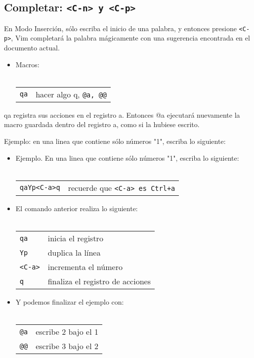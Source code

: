 \documentclass[12pt]{article}
\begin{document}
\subsection{Completar: \texttt{<C-n> y <C-p>}}


En Modo Inserción, sólo escriba el inicio de una palabra,
y entonces presione \texttt{<C-p>}, Vim completará la palabra mágicamente con
una sugerencia encontrada en el documento actual.


\begin{itemize}
	\item Macros: \\ \\ 
\begin{tabular}{ l l }
	\texttt{qa} & hacer algo q, \texttt{@a, @@}
\end{tabular}
\end{itemize}

qa registra sus acciones en el registro a. Entonces @a ejecutará nuevamente
la macro guardada dentro del registro a, como si la hubiese escrito.

Ejemplo: en una linea que contiene sólo números "1", escriba lo siguiente:

\begin{itemize}
	\item Ejemplo. En una linea que contiene sólo números "1", escriba lo siguiente: \\ \\
\begin{tabular}{ l l }
	\texttt{qaYp<C-a>q} & recuerde que \texttt{<C-a> es Ctrl+a} \\
\end{tabular}
\end{itemize}
\begin{itemize}
	\item El comando anterior realiza lo siguiente: \\ \\
\begin{tabular}{ l l }
            \texttt{qa} & inicia el registro \\
            \texttt{Yp} & duplica la línea \\
            \texttt{<C-a>} & incrementa el número \\
            \texttt{q} & finaliza el registro de acciones \\
\end{tabular}
\end{itemize}
\begin{itemize}
	\item Y podemos finalizar el ejemplo con: \\ \\
\begin{tabular}{ l l }
	\texttt{@a} & escribe 2 bajo el 1 \\
	\texttt{@@} & escribe 3 bajo el 2 \\
\end{tabular}
\end{itemize}
\end{document}
